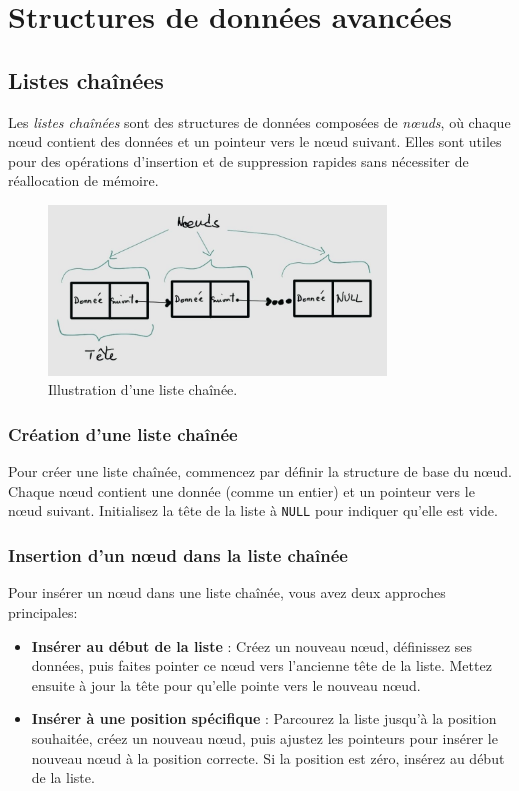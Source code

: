 \chapter{Structures de données avancées}

\section{Listes chaînées}
Les \emph{listes chaînées} sont des structures de données composées de \emph{nœuds}, où chaque nœud contient des données et un pointeur vers le nœud suivant. Elles sont utiles pour des opérations d'insertion et de suppression rapides sans nécessiter de réallocation de mémoire.

\begin{figure}[H]
	\centering
	\includegraphics[width=0.8\textwidth]{image/linkedlist}
	\caption{Illustration d'une liste chaînée.}
\end{figure}

\subsection{Création d'une liste chaînée}

Pour créer une liste chaînée, commencez par définir la structure de base du nœud. Chaque nœud contient une donnée (comme un entier) et un pointeur vers le nœud suivant. Initialisez la tête de la liste à \texttt{NULL} pour indiquer qu'elle est vide.

\subsection{Insertion d'un nœud dans la liste chaînée}

Pour insérer un nœud dans une liste chaînée, vous avez deux approches principales:

\begin{itemize}
	\item \textbf{Insérer au début de la liste} : Créez un nouveau nœud, définissez ses données, puis faites pointer ce nœud vers l'ancienne tête de la liste. Mettez ensuite à jour la tête pour qu'elle pointe vers le nouveau nœud.
	
	\item \textbf{Insérer à une position spécifique} : Parcourez la liste jusqu'à la position souhaitée, créez un nouveau nœud, puis ajustez les pointeurs pour insérer le nouveau nœud à la position correcte. Si la position est zéro, insérez au début de la liste.
\end{itemize}

